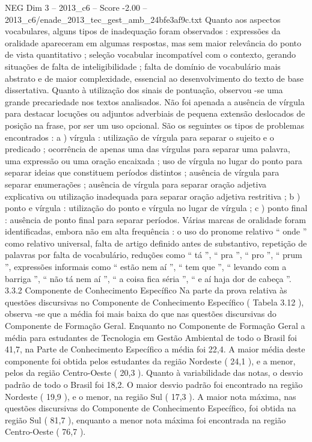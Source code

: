 \begin{textsample}{NEG Dim 3 – 2013\_c6 – Score -2.00 – 2013\_c6/enade\_2013\_tec\_gest\_amb\_24bfe3af9c.txt}
Quanto aos aspectos vocabulares, alguns tipos de inadequação foram observados : expressões da oralidade apareceram em algumas respostas, mas sem maior relevância do ponto de vista quantitativo ; seleção vocabular incompatível com o contexto, gerando situações de falta de inteligibilidade ; falta de domínio de vocabulário mais abstrato e de maior complexidade, essencial ao desenvolvimento do texto de base dissertativa.
Quanto à utilização dos sinais de pontuação, observou -se uma grande precariedade nos textos analisados.
Não foi apenada a ausência de vírgula para destacar locuções ou adjuntos adverbiais de pequena extensão deslocados de posição na frase, por ser um uso opcional.
São os seguintes os tipos de problemas encontrados : a ) vírgula : utilização de vírgula para separar o sujeito e o predicado ; ocorrência de apenas uma das vírgulas para separar uma palavra, uma expressão ou uma oração encaixada ; uso de vírgula no lugar do ponto para separar ideias que constituem períodos distintos ; ausência de vírgula para separar enumerações ; ausência de vírgula para separar oração adjetiva explicativa ou utilização inadequada para separar oração adjetiva restritiva ; b ) ponto e vírgula : utilização do ponto e vírgula no lugar de vírgula ; c ) ponto final : ausência de ponto final para separar períodos.
Várias marcas de oralidade foram identificadas, embora não em alta frequência : o uso do pronome relativo “ onde ” como relativo universal, falta de artigo definido antes de substantivo, repetição de palavras por falta de vocabulário, reduções como “ tá ”, “ pra ”, “ pro ”, “ prum ”, expressões informais como “ estão nem aí ”, “ tem que ”, “ levando com a barriga ”, “ não tá nem aí ”, “ a coisa fica séria ”, “ e aí haja dor de cabeça ”. 3.3.2 Componente de Conhecimento Específico Na parte da prova relativa às questões discursivas no Componente de Conhecimento Específico ( Tabela 3.12 ), observa -se que a média foi mais baixa do que nas questões discursivas do Componente de Formação Geral.
Enquanto no Componente de Formação Geral a média para estudantes de Tecnologia em Gestão Ambiental de todo o Brasil foi 41,7, na Parte de Conhecimento Específico a média foi 22,4.
A maior média deste componente foi obtida pelos estudantes da região Nordeste ( 24,1 ), e a menor, pelos da região Centro-Oeste ( 20,3 ).
Quanto à variabilidade das notas, o desvio padrão de todo o Brasil foi 18,2.
O maior desvio padrão foi encontrado na região Nordeste ( 19,9 ), e o menor, na região Sul ( 17,3 ).
A maior nota máxima, nas questões discursivas do Componente de Conhecimento Específico, foi obtida na região Sul ( 81,7 ), enquanto a menor nota máxima foi encontrada na região Centro-Oeste ( 76,7 ).

\end{textsample}
